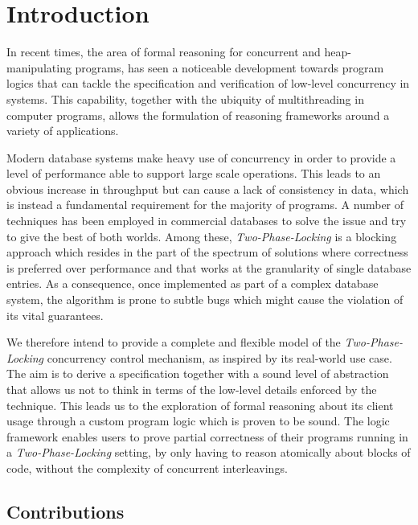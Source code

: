 \section{Introduction}

In recent times, the area of formal reasoning for concurrent and heap-manipulating programs, has seen a noticeable development towards program logics that can tackle the specification and verification of low-level concurrency in systems. This capability, together with the ubiquity of multithreading in computer programs, allows the formulation of reasoning frameworks around a variety of applications.

Modern database systems make heavy use of concurrency in order to provide a level of performance able to support large scale operations. This leads to an obvious increase in throughput but can cause a lack of consistency in data, which is instead a fundamental requirement for the majority of programs. A number of techniques has been employed in commercial databases to solve the issue and try to give the best of both worlds. Among these, \textit{Two-Phase-Locking} is a blocking approach which resides in the part of the spectrum of solutions where correctness is preferred over performance and that works at the granularity of single database entries. As a consequence, once implemented as part of a complex database system, the algorithm is prone to subtle bugs which might cause the violation of its vital guarantees.

We therefore intend to provide a complete and flexible model of the \textit{Two-Phase-Locking} concurrency control mechanism, as inspired by its real-world use case.
The aim is to derive a specification together with a sound level of abstraction that allows us not to think in terms of the low-level details enforced by the technique.
This leads us to the exploration of formal reasoning about its client usage through a custom program logic which is proven to be sound. The logic framework enables users to prove partial correctness of their programs running in a \textit{Two-Phase-Locking} setting, by only having to reason atomically about blocks of code, without the complexity of concurrent interleavings.

\subsection{Contributions}